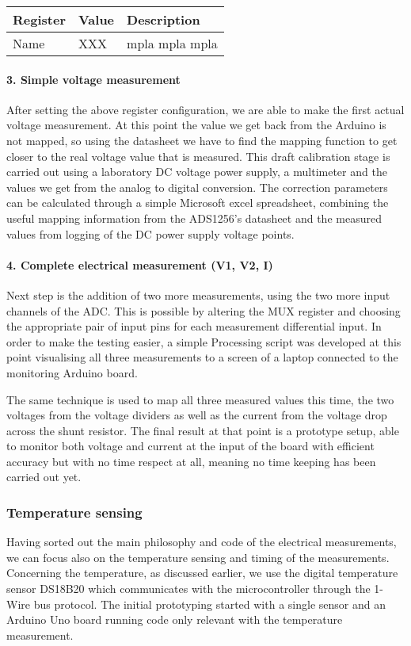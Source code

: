 \begin{center}
\begin{tabular}{ l l l } 
 Register & Value & Description \\ \hline
 Name & XXX & mpla mpla mpla
\end{tabular}
\end{center}

\paragraph{3. Simple voltage measurement\\}
After setting the above register configuration, we are able to make the first actual voltage measurement. At this point the value we get back from the Arduino is not mapped, so using the datasheet we have to find the mapping function to get closer to the real voltage value that is measured. This draft calibration stage is carried out using a laboratory DC voltage power supply, a multimeter and the values we get from the analog to digital conversion. The correction parameters can be calculated through a simple Microsoft excel spreadsheet, combining the useful mapping information from the ADS1256's datasheet and the measured values from logging of the DC power supply voltage points.

\paragraph{4. Complete electrical measurement (V1, V2, I)\\}
Next step is the addition of two more measurements, using the two more input channels of the ADC. This is possible by altering the MUX register and choosing the appropriate pair of input pins for each measurement differential input. In order to make the testing easier, a simple Processing script was developed at this point visualising all three measurements to a screen of a laptop connected to the monitoring Arduino board.

The same technique is used to map all three measured values this time, the two voltages from the voltage dividers as well as the current from the voltage drop across the shunt resistor. The final result at that point is a prototype setup, able to monitor both voltage and current at the input of the board with efficient accuracy but with no time respect at all, meaning no time keeping has been carried out yet.

\subsubsection{Temperature sensing}
Having sorted out the main philosophy and code of the electrical measurements, we can focus also on the temperature sensing and timing of the measurements. Concerning the temperature, as discussed earlier, we use the digital temperature sensor DS18B20 which communicates with the microcontroller through the 1-Wire bus protocol. The initial prototyping started with a single sensor and an Arduino Uno board running code only relevant with the temperature measurement. 

